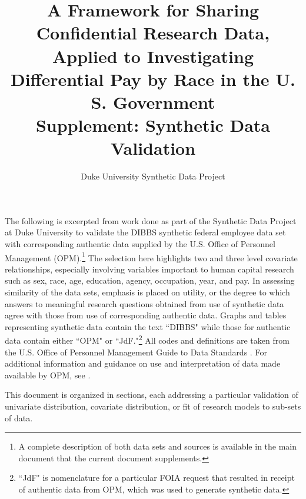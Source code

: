 \documentclass[10pt, letterpaper]{article}
\title{\Large A Framework for Sharing Confidential Research Data, Applied to Investigating Differential Pay by Race in the U. S. Government\\
\vspace{12pt} \Large Supplement:  Synthetic Data Validation}
\author{Duke University Synthetic Data Project}
\begin{document}
\begin{spacing}{1.0}

\maketitle

\vspace{20pt}

The following is excerpted from work done as part of the Synthetic Data Project at Duke University to validate the DIBBS synthetic federal employee data set with corresponding authentic data supplied by the U.S. Office of Personnel Management (OPM).\footnote{A complete description of both data sets and sources is available in the main document that the current document supplements.}  The selection here highlights two and three level covariate relationships, especially involving variables important to human capital research such as sex, race, age, education, agency, occupation, year, and pay.  In assessing similarity of the data sets, emphasis is placed on utility, or the degree to which answers to meaningful research questions obtained from use of synthetic data agree with those from use of corresponding authentic data.  Graphs and tables representing synthetic data contain the text ``DIBBS" while those for authentic data contain either ``OPM" or ``JdF."\footnote{``JdF" is nomenclature for a particular FOIA request that resulted in receipt of authentic data from OPM, which was used to generate synthetic data.}  All codes and definitions are taken from the U.S. Office of Personnel Management Guide to Data Standards \citep{OPMGDS}.  For additional information and guidance on use and interpretation of data made available by OPM, see \citep{OPMDataAnalysis}.\\

\clearpage

This document is organized in sections, each addressing a particular validation of univariate distribution, covariate distribution, or fit of research models to sub-sets of data.

\renewcommand\cfttoctitlefont{\large}
\renewcommand\cftsecfont{\normalsize}
\renewcommand\cftsecpagefont{\normalsize}
\renewcommand\cftsubsecfont{\normalsize}
\renewcommand\cftsubsecpagefont{\normalsize}
\renewcommand{\cftsecleader}{\cftdotfill{\cftdotsep}}
\renewcommand*\contentsname{List of Sections}
\begin{center}
    \begin{minipage}{5.5in}
        \tableofcontents
    \end{minipage}
\end{center}


\end{spacing}
\end{document}
